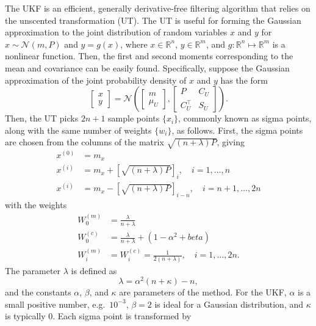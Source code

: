 \documentclass[../zhang_thesis.tex]{subfiles}
\begin{document}
The UKF is an efficient, generally derivative-free filtering algorithm that relies on the unscented transformation (UT). The UT is useful for forming the Gaussian approximation to the joint distribution of random variables $x$ and $y$ for $x\sim \mathcal{N}(m,P)$ and $y=g(x)$, where $x\in\mathbb{R}^n$, $y\in\mathbb{R}^m$, and $g:\mathbb{R}^n\mapsto\mathbb{R}^m$ is a nonlinear function. Then, the first and second moments corresponding to the mean and covariance can be
easily found. Specifically, suppose the Gaussian approximation of the joint probability density of $x$ and $y$ has the form
\begin{equation}
    \begin{bmatrix} x \\ y \end{bmatrix} = \mathcal{N} \left( \begin{bmatrix} m \\ \mu_U \end{bmatrix}, \begin{bmatrix} P & C_U \\ C_U^\top & S_U \end{bmatrix} \right).
\end{equation}
Then, the UT picks $2n+1$ sample points $\{x_i\}$, commonly known as sigma points, along with the same number of weights $\{w_i\}$, as follows. First, the sigma points are chosen from the columns of the matrix $\sqrt{(n+\lambda)P}$, giving
\begin{align}
    x^{(0)} & = m_x \\
    x^{(i)} & = m_x + \left[ \sqrt{(n+\lambda)P} \right]_i, \quad i=1,\dots,n \\
    x^{(i)} & = m_x - \left[ \sqrt{(n+\lambda)P} \right]_{i-n}, \quad i=n+1,\dots,2n
\end{align}
with the weights
\begin{align}
    W_0^{(m)} & = \frac{\lambda}{n+\lambda} \\
    W_0^{(c)} & = \frac{\lambda}{n+\lambda} + (1-\alpha^2+beta) \\
    W_i^{(m)} & = W_i^{(c)} = \frac{1}{2(n+\lambda)}, \quad i=1,\dots,2n.
\end{align}
The parameter $\lambda$ is defined as
\begin{equation}
    \lambda = \alpha^2 (n+\kappa) - n,
\end{equation}
and the constants $\alpha$, $\beta$, and $\kappa$ are parameters of the method. For the UKF, $\alpha$ is a small positive number, e.g.\ $10^{-3}$, $\beta=2$ is ideal for a Gaussian distribution, and $\kappa$ is typically 0. Each sigma point is transformed by
\end{document}
